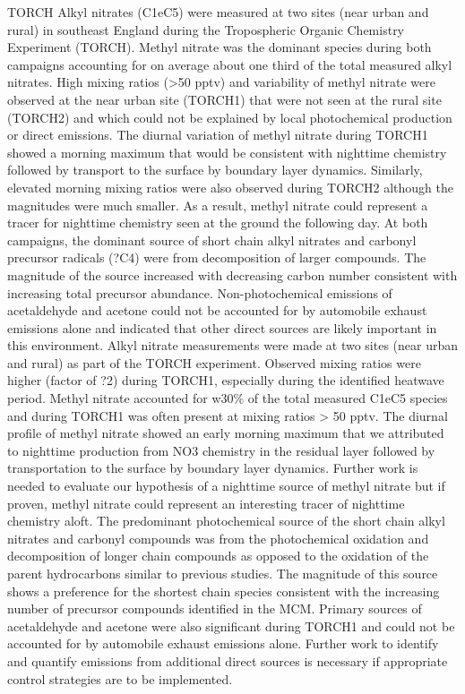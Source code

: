 \documentclass[11pt,a4paper]{article}
\begin{document}
\citep{Worton2010} TORCH
Alkyl nitrates (C1eC5) were measured at two sites (near urban and rural) in southeast England during the Tropospheric Organic Chemistry Experiment (TORCH). Methyl nitrate was the dominant species during both campaigns accounting for on average about one third of the total measured alkyl nitrates. High mixing ratios (>50 pptv) and variability of methyl nitrate were observed at the near urban site (TORCH1) that were not seen at the rural site (TORCH2) and which could not be explained by local photochemical production or direct emissions. The diurnal variation of methyl nitrate during TORCH1 showed a morning maximum that would be consistent with nighttime chemistry followed by transport to the surface by boundary layer dynamics. Similarly, elevated morning mixing ratios were also observed during TORCH2 although the magnitudes were much smaller. As a result, methyl nitrate could represent a tracer for nighttime chemistry seen at the ground the following day. At both campaigns, the dominant source of short chain alkyl nitrates and carbonyl precursor radicals (?C4) were from decomposition of larger compounds. The magnitude of the source increased with decreasing carbon number consistent with increasing total precursor abundance. Non-photochemical emissions of acetaldehyde and acetone could not be accounted for by automobile exhaust emissions alone and indicated that other direct sources are likely important in this environment.
Alkyl nitrate measurements were made at two sites (near urban
and rural) as part of the TORCH experiment. Observed mixing ratios
were higher (factor of ?2) during TORCH1, especially during the identified heatwave period. Methyl nitrate accounted for w30\% of the total measured C1eC5 species and during TORCH1 was often present at mixing ratios > 50 pptv. The diurnal profile of methyl nitrate showed an early morning maximum that we attributed to nighttime production from NO3 chemistry in the residual layer followed by transportation to the surface by boundary layer dynamics. Further work is needed to evaluate our hypothesis of a nighttime source of methyl nitrate but if proven, methyl nitrate could represent an interesting tracer of nighttime chemistry aloft. The predominant photochemical source of the short chain alkyl nitrates and carbonyl compounds was from the photochemical oxidation and decomposition of longer chain compounds as opposed to the oxidation of the parent hydrocarbons similar to previous studies. The magnitude of this source shows a preference for the shortest chain species consistent with the increasing number of precursor compounds identified in the MCM. Primary sources of acetaldehyde and acetone were also significant during TORCH1 and could not be accounted for by automobile exhaust emissions alone. Further work to identify and quantify emissions from additional direct sources is necessary if appropriate control strategies are to be implemented.
\end{document}
